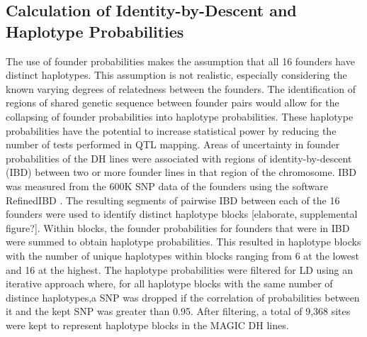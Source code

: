 \documentclass[article,9pt,twocolumn,twoside]{rilabRxiv}
\begin{document}
\subsection{Calculation of Identity-by-Descent and Haplotype Probabilities}
The use of founder probabilities makes the assumption that all 16 founders have
distinct haplotypes. This assumption is not realistic, especially considering the
known varying degrees of relatedness between the founders. The identification of
regions of shared genetic sequence between founder pairs would allow for the collapsing
of founder probabilities into haplotype probabilities. These haplotype probabilities
have the potential to increase statistical power by reducing the number of tests
performed in QTL mapping. Areas of uncertainty in founder probabilities of the
DH lines were associated with regions of identity-by-descent (IBD) between two or
more founder lines in that region of the chromosome. IBD was measured from the
600K SNP data of the founders using the software RefinedIBD \citep{Browning459}.
The resulting segments
of pairwise IBD between each of the 16 founders were used to identify distinct
haplotype blocks [elaborate, supplemental figure?]. Within blocks, the founder
probabilities for founders that were in  IBD were summed to obtain haplotype
probabilities. This resulted in haplotype blocks with the number of
unique haplotypes within blocks ranging from 6 at the lowest and 16 at the highest.
The haplotype probabilities were filtered for LD using an iterative approach where,
for all haplotype blocks with the same number of distince haplotypes,a SNP was
dropped if the correlation of probabilities between it and the kept SNP was
greater than 0.95. After filtering, a total of 9,368 sites were kept to represent
haplotype blocks in the MAGIC DH lines.

\end{document}
